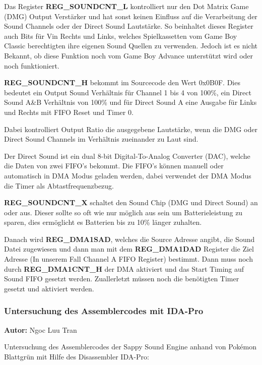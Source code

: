 \documentclass[11pt,a4paper]{scrartcl}
\newcommand{\AutorNgoc} {
    \vspace{-4mm}
    \large \textbf{Autor:} Ngoc Luu Tran \normalsize
    \vspace{2mm}
}
\begin{document}
Das Register \textbf{REG\_SOUNDCNT\_L} kontrolliert nur den Dot Matrix Game (DMG) Output Verst\"arker und hat sonst keinen Einfluss auf die Verarbeitung der Sound Channels oder der Direct Sound Lautst\"arke. So beinhaltet dieses Register auch Bits f\"ur Vin Rechts und Links, welches Spielkassetten vom Game Boy Classic berechtigten ihre eigenen Sound Quellen zu verwenden. Jedoch ist es nicht Bekannt, ob diese Funktion noch vom Game Boy Advance unterst\"utzt wird oder noch funktioniert.


\textbf{REG\_SOUNDCNT\_H} bekommt im Sourcecode den Wert 0x0B0F. Dies bedeutet ein Output Sound Verh\"altnis f\"ur Channel 1 bis 4 von 100\%, ein Direct Sound A\&B Verh\"altnis von 100\% und f\"ur Direct Sound A eine Ausgabe f\"ur Links und Rechts mit FIFO Reset und Timer 0.

Dabei kontrolliert Output Ratio die ausgegebene Lautst\"arke, wenn die DMG oder Direct Sound Channels im Verh\"altnis zueinander zu Laut sind.

Der Direct Sound ist ein dual 8-bit Digital-To-Analog Converter (DAC), welche die Daten von zwei FIFO's bekommt. Die FIFO's k\"onnen manuell oder automatisch in DMA Modus geladen werden, dabei verwendet der DMA Modus die Timer als Abtastfrequenzbezug.


\textbf{REG\_SOUNDCNT\_X} schaltet den Sound Chip (DMG und Direct Sound) an oder aus. Dieser sollte so oft wie nur m\"oglich aus sein um Batterieleistung zu sparen, dies erm\"oglicht es Batterien bis zu 10\% l\"anger zuhalten. 


Danach wird \textbf{REG\_DMA1SAD}, welches die Source Adresse angibt, die Sound Datei zugewiesen und dann man mit dem \textbf{REG\_DMA1DAD} Register die Ziel Adresse (In unserem Fall Channel A FIFO Register) bestimmt. Dann muss noch durch \textbf{REG\_DMA1CNT\_H} der DMA aktiviert und das Start Timing auf Sound FIFO gesetzt werden. Zuallerletzt m\"ussen noch die ben\"otigten Timer gesetzt und aktiviert werden.


\newpage

\subsubsection{Untersuchung des Assemblercodes mit IDA-Pro} \label{Assemblercode}
\AutorNgoc

Untersuchung des Assemblercodes der Sappy Sound Engine anhand von Pok\'{e}mon Blattgr\"un mit Hilfe des Disassembler IDA-Pro:
\end{document}
